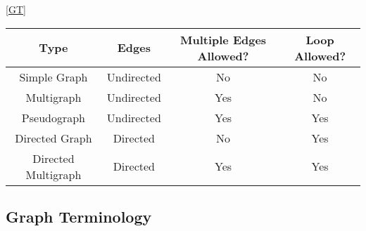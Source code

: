 \ref{GT}

\begin{table*}[htb]
    \centering
    \caption{Graph Terminology}
    \label{GT}
    \begin{tabular}[c]{|c|c|c|c|}\hline
        Type & Edges & Multiple Edges Allowed? & Loop Allowed?\\\hline
        Simple Graph & Undirected & No & No \\
        Multigraph & Undirected & Yes & No\\
        Pseudograph & Undirected & Yes & Yes\\
        Directed Graph & Directed & No & Yes\\
        Directed Multigraph & Directed & Yes & Yes\\\hline
    \end{tabular}
\end{table*}

\subsection{Graph Terminology}
